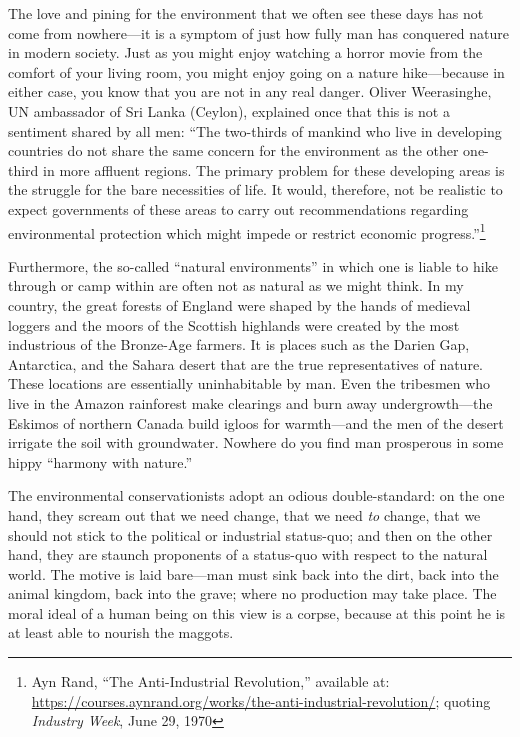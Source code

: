 \documentclass[11pt]{article}
\begin{document}
The love and pining for the environment that we often see these days has not come from nowhere---it is a symptom of just how fully man has conquered nature in modern society. Just as you might enjoy watching a horror movie from the comfort of your living room, you might enjoy going on a nature hike---because in either case, you know that you are not in any real danger. Oliver Weerasinghe, UN ambassador of Sri Lanka (Ceylon), explained once that this is not a sentiment shared by all men: ``The two-thirds of mankind who live in developing countries do not share the same concern for the environment as the other one-third in more affluent regions. The primary problem for these developing areas is the struggle for the bare necessities of life. It would, therefore, not be realistic to expect governments of these areas to carry out recommendations regarding environmental protection which might impede or restrict economic progress.''\footnote{Ayn Rand, ``The Anti-Industrial Revolution,'' available at: \url{https://courses.aynrand.org/works/the-anti-industrial-revolution/}; quoting \emph{Industry Week}, June 29, 1970}

Furthermore, the so-called ``natural environments'' in which one is liable to hike through or camp within are often not as natural as we might think. In my country, the great forests of England were shaped by the hands of medieval loggers and the moors of the Scottish highlands were created by the most industrious of the Bronze-Age farmers. It is places such as the Darien Gap, Antarctica, and the Sahara desert that are the true representatives of nature. These locations are essentially uninhabitable by man. Even the tribesmen who live in the Amazon rainforest make clearings and burn away undergrowth---the Eskimos of northern Canada build igloos for warmth---and the men of the desert irrigate the soil with groundwater. Nowhere do you find man prosperous in some hippy ``harmony with nature.''

The environmental conservationists adopt an odious double-standard: on the one hand, they scream out that we need change, that we need \emph{to} change, that we should not stick to the political or industrial status-quo; and then on the other hand, they are staunch proponents of a status-quo with respect to the natural world. The motive is laid bare---man must sink back into the dirt, back into the animal kingdom, back into the grave; where no production may take place. The moral ideal of a human being on this view is a corpse, because at this point he is at least able to nourish the maggots.
\end{document}
